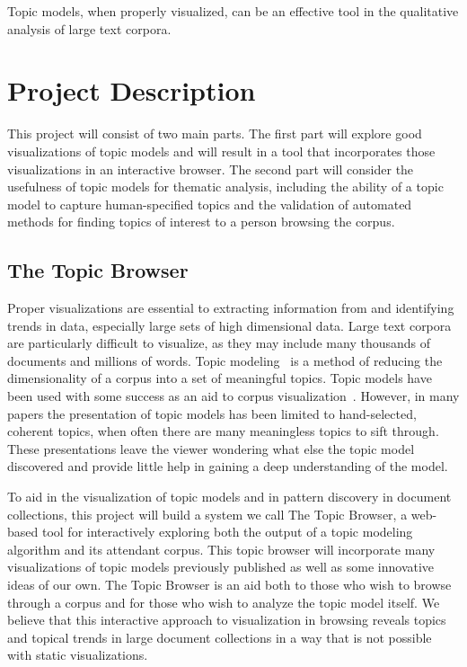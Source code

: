 \documentclass[ms]{byuprop}
\begin{document}
Topic models, when properly visualized, can be an effective tool in the
qualitative analysis of large text corpora.


\section{Project Description}

This project will consist of two main parts.  The first part will explore good
visualizations of topic models and will result in a tool that incorporates
those visualizations in an interactive browser.  The second part will consider
the usefulness of topic models for thematic analysis, including the ability of
a topic model to capture human-specified topics and the validation of automated
methods for finding topics of interest to a person browsing the corpus.

\subsection{The Topic Browser}

Proper visualizations are essential to extracting information from and
identifying trends in data, especially large sets of high dimensional data.
Large text corpora are particularly difficult to visualize, as they may include
many thousands of documents and millions of words.  Topic
modeling~\cite{blei-2003-latent-dirichlet-allocation} is a method of reducing
the dimensionality of a corpus into a set of meaningful topics.  Topic models
have been used with some success as an aid to corpus
visualization~\cite{blei-2009-topic-models,
newman-2010-visualizing-with-topic-maps}.  However, in many papers the
presentation of topic models has been limited to hand-selected, coherent
topics, when often there are many meaningless topics to sift through.  These
presentations leave the viewer wondering what else the topic model discovered
and provide little help in gaining a deep understanding of the model.

To aid in the visualization of topic models and in pattern discovery in
document collections, this project will build a system we call The Topic
Browser, a web-based tool for interactively exploring both the output of a
topic modeling algorithm and its attendant corpus.  This topic browser will
incorporate many visualizations of topic models previously published as well
as some innovative ideas of our own.  The Topic Browser is an aid both to those
who wish to browse through a corpus and for those who wish to analyze the topic
model itself.  We believe that this interactive approach to visualization in
browsing reveals topics and topical trends in large document collections in a
way that is not possible with static visualizations.
\end{document}
